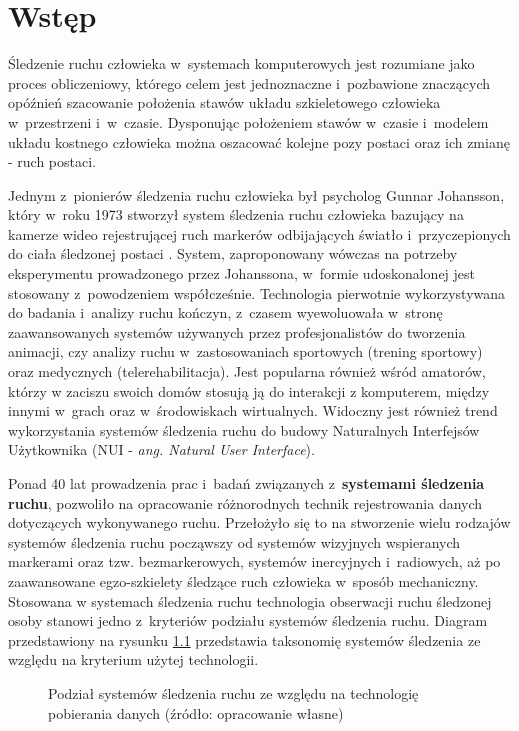 
\chapter{Wstęp}\label{chap:intro}
Śledzenie ruchu człowieka w~systemach komputerowych jest rozumiane jako proces obliczeniowy, którego celem jest jednoznaczne i~pozbawione znaczących opóźnień szacowanie położenia stawów układu szkieletowego człowieka w~przestrzeni i~w~czasie. Dysponując położeniem stawów w~czasie i~modelem układu kostnego człowieka można oszacować kolejne pozy postaci oraz ich zmianę - ruch postaci.

Jednym z~pionierów śledzenia ruchu człowieka był psycholog Gunnar Johansson, który w~roku 1973 stworzył system śledzenia ruchu człowieka bazujący na kamerze wideo rejestrującej ruch markerów odbijających światło i~przyczepionych do ciała śledzonej postaci \cite{Johansson1973}. System, zaproponowany wówczas na potrzeby eksperymentu prowadzonego przez Johanssona, w~formie udoskonalonej jest stosowany z~powodzeniem współcześnie. Technologia pierwotnie wykorzystywana do badania i~analizy ruchu kończyn, z~czasem wyewoluowała w~stronę zaawansowanych systemów używanych przez profesjonalistów do tworzenia animacji, czy analizy ruchu w~zastosowaniach sportowych (trening sportowy) oraz medycznych (telerehabilitacja). Jest popularna również wśród amatorów, którzy w zaciszu swoich domów stosują ją do interakcji z komputerem, między innymi w~grach oraz w~środowiskach wirtualnych. Widoczny jest również trend wykorzystania systemów śledzenia ruchu do budowy Naturalnych Interfejsów Użytkownika\cite{Glonek_Pietruszka_2012} (NUI - \emph{ang. Natural User Interface}).

Ponad 40 lat prowadzenia prac i~badań związanych z~\textbf{systemami śledzenia ruchu}, pozwoliło na opracowanie różnorodnych technik rejestrowania danych dotyczących wykonywanego ruchu. Przełożyło się to na stworzenie wielu rodzajów systemów śledzenia ruchu począwszy od systemów wizyjnych wspieranych markerami oraz tzw. bezmarkerowych, systemów inercyjnych i~radiowych, aż po zaawansowane egzo-szkielety śledzące ruch człowieka w~sposób mechaniczny. Stosowana w systemach śledzenia ruchu technologia obserwacji ruchu śledzonej osoby stanowi jedno z~kryteriów podziału systemów śledzenia ruchu. Diagram przedstawiony na rysunku \ref{fig:literature:mocapSystems:diagram} przedstawia taksonomię systemów śledzenia ze względu na kryterium użytej technologii.

\begin{savenotes}
	\begin{figure}[!htb]
		\centering
		
		\caption{Podział systemów śledzenia ruchu ze względu na technologię pobierania danych (źródło: opracowanie własne)}
		\label{fig:literature:mocapSystems:diagram}
	\end{figure}
\end{savenotes}

